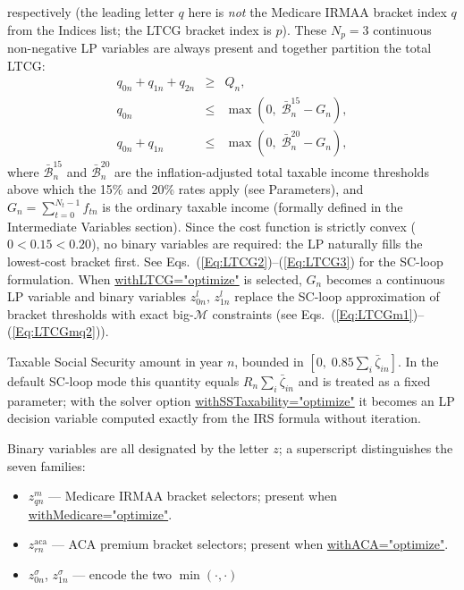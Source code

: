 \documentclass[fleqn,12pt]{report}
\newcommand{\code}[1]{\url{#1}}
\begin{document}
\begin{description}[leftmargin=4em,style=multiline]
	respectively (the leading letter $q$ here is \emph{not} the Medicare IRMAA bracket index $q$
	from the Indices list; the LTCG bracket index is $p$).
	These $N_p = 3$ continuous non-negative LP variables are always present
	and together partition the total LTCG:
	\begin{eqnarray}
		q_{0n} + q_{1n} + q_{2n} &\ge& Q_n, \label{Eq:qpart} \\
		q_{0n} &\le& \max\!\left(0,\; \bar{\mathcal{B}}^{15}_n - G_n\right), \label{Eq:q0cap} \\
		q_{0n} + q_{1n} &\le& \max\!\left(0,\; \bar{\mathcal{B}}^{20}_n - G_n\right), \label{Eq:q1cap}
	\end{eqnarray}
	where $\bar{\mathcal{B}}^{15}_n$ and $\bar{\mathcal{B}}^{20}_n$ are the inflation-adjusted total taxable income
	thresholds above which the 15\% and 20\% rates apply (see Parameters), and
	$G_n = \sum_{t=0}^{N_t-1} f_{tn}$ is the ordinary taxable income (formally defined in the
	Intermediate Variables section).
	Since the cost function is strictly convex ($0 < 0.15 < 0.20$),
	no binary variables are required: the LP naturally fills the lowest-cost bracket first.
	See Eqs.~(\ref{Eq:LTCG2})--(\ref{Eq:LTCG3}) for the SC-loop formulation.
	When \code{withLTCG="optimize"} is selected, $G_n$ becomes a continuous LP variable
	and binary variables $z^l_{0n},\,z^l_{1n}$ replace the SC-loop approximation of
	bracket thresholds with exact big-$\mathcal{M}$ constraints
	(see Eqs.~(\ref{Eq:LTCGm1})--(\ref{Eq:LTCGmq2})).
\item [$t^{\sigma}_n$]
	Taxable Social Security amount in year $n$, bounded in
	$[0,\;0.85\sum_i\bar{\zeta}_{in}]$.
	In the default SC-loop mode this quantity equals $R_n\sum_i\bar{\zeta}_{in}$
	and is treated as a fixed parameter; with the solver option
	\code{withSSTaxability="optimize"} it becomes an LP decision variable computed
	exactly from the IRS formula without iteration.
\item [$z_{*}^*$]
	Binary variables are all designated by the letter $z$; a superscript
	distinguishes the seven families:
	\begin{itemize}[nosep]
	  \item $z_{qn}^m$ --- Medicare IRMAA bracket selectors; present when
	    \code{withMedicare="optimize"}.
	  \item $z_{rn}^{\mathrm{aca}}$ --- ACA premium bracket selectors; present when
	    \code{withACA="optimize"}.
	  \item $z^{\sigma}_{0n}$, $z^{\sigma}_{1n}$ --- encode the two $\min(\cdot,\cdot)$

\end{itemize}
\end{description}
\end{document}
